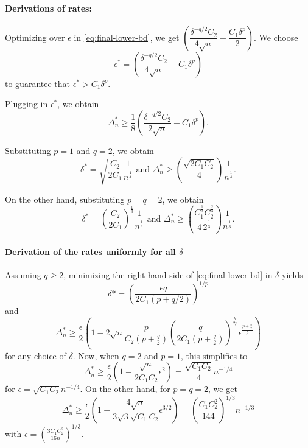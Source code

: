 \paragraph{Derivations of rates:}
 Optimizing over $\epsilon$ in \eqref{eq:final-lower-bd}, we get
$ \left(\dfrac{\delta^{-q/2}C_2}{4\sqrt{n}} + \dfrac{C_1\delta^p}{2}\right)$. We choose
\[
\epsilon^* = \left(\dfrac{\delta^{-q/2}C_2}{4\sqrt{n}} + C_1\delta^p\right)
\]
to guarantee that $\epsilon^*>C_1 \delta^p$.

 Plugging in $\epsilon^*$, we obtain
 \[
 \Delta_n^*
 \ge \frac18 \left(\dfrac{\delta^{-q/2}C_2}{2\sqrt{n}} + C_1\delta^p \right).
 \]

Substituting $p=1$ and $q=2$, we obtain
\[
\delta^*= \sqrt{\dfrac{C_2}{2C_1}}\dfrac{1}{n^{\frac{1}{4}}} \text{ and } 
\Delta_n^* \ge \left(\dfrac{\sqrt{2C_1C_2}}{4}\right)\dfrac{1}{n^{\frac{1}{4}}}.
\]

On the other hand, substituting $p=q=2$, we obtain
\[
\delta^*= \left(\dfrac{C_2}{2C_1}\right)^{\frac{1}{3}}\dfrac{1}{n^{\frac{1}{6}}} \text{ and } \Delta_n^* \ge \left(\dfrac{C_1^{\frac{1}{3}}C_2^{\frac{2}{3}}}{4\, 2^{\frac{1}{3}}}\right)\dfrac{1}{n^{\frac{1}{3}}}.
\]

\paragraph{Derivation of the rates uniformly for all $\delta$}

Assuming $q \ge 2$, minimizing the right hand side of \eqref{eq:final-lower-bd} in $\delta$ yields
\[
\delta*=\left(\frac{\epsilon q}{2C_1(p+q/2)}\right)^{1/p}
\]
and
\[
\Delta_n^* \ge \dfrac{\epsilon}{2} \left(1 - 2\sqrt{n}  \dfrac{p}{C_2(p+\tfrac{q}{2})} \left(\dfrac{q}{2C_1(p+\tfrac{q}{2})}\right)^{\frac{q}{2p}} \epsilon^{\frac{p+\tfrac{q}{2}}{p}}\right)
\]
for any choice of $\delta$. Now, when $q=2$ and $p=1$, this simplifies to
\[
\Delta_n^* \ge \dfrac{\epsilon}{2} \left(1 - \frac{\sqrt{n}}{2C_1 C_2} \epsilon^2\right) = \frac{\sqrt{C_1 C_2}}{4} n^{-1/4}
\]
for $\epsilon=\sqrt{C_1C_2} n^{-1/4}$. On the other hand, for $p=q=2$, we get
\[
\Delta_n^* \ge \dfrac{\epsilon}{2} \left(1-\frac{4\sqrt{n}}{3\sqrt{3} \sqrt{C_1} C_2} \epsilon^{3/2}\right)
= \left(\frac{C_1 C_2^2}{144}\right)^{1/3} n^{-1/3}
\]
with $\epsilon=\left(\frac{3 C_1 C_2^2}{16 n}\right)^{1/3}$.



